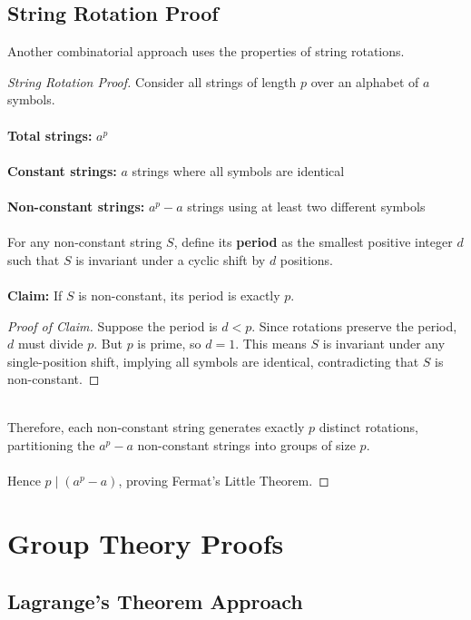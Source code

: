 \documentclass[12pt,openany]{book}
\theoremstyle{definition}
\theoremstyle{plain}
\theoremstyle{remark}
\begin{document}
\section{String Rotation Proof}

Another combinatorial approach uses the properties of string rotations.

\begin{proof}[String Rotation Proof]
Consider all strings of length $p$ over an alphabet of $a$ symbols.
\noindent
\\
\\
\textbf{Total strings:} $a^p$
\noindent
\\
\\
\textbf{Constant strings:} $a$ strings where all symbols are identical
\noindent
\\
\\
\textbf{Non-constant strings:} $a^p - a$ strings using at least two different symbols
\noindent
\\
\\
For any non-constant string $S$, define its \textbf{period} as the smallest positive integer $d$ such that $S$ is invariant under a cyclic shift by $d$ positions.
\noindent
\\
\\
\textbf{Claim:} If $S$ is non-constant, its period is exactly $p$.

\begin{proof}[Proof of Claim]
Suppose the period is $d < p$. Since rotations preserve the period, $d$ must divide $p$. But $p$ is prime, so $d = 1$. This means $S$ is invariant under any single-position shift, implying all symbols are identical, contradicting that $S$ is non-constant.
\end{proof}
\noindent
\\
Therefore, each non-constant string generates exactly $p$ distinct rotations, partitioning the $a^p - a$ non-constant strings into groups of size $p$.
\noindent
\\
\\
Hence $p \mid (a^p - a)$, proving Fermat's Little Theorem.
\end{proof}

\chapter{Group Theory Proofs}

\section{Lagrange's Theorem Approach}
\end{document}
